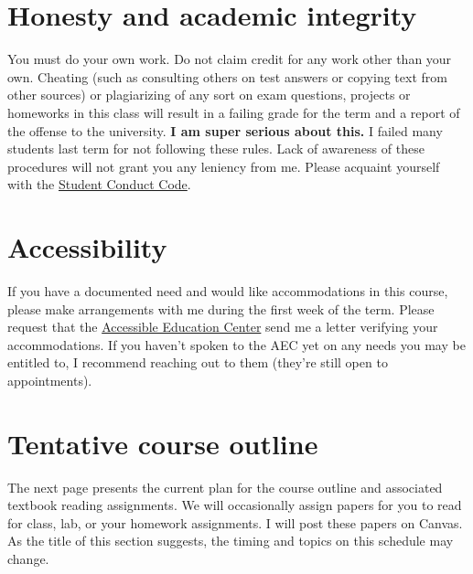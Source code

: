 \documentclass[10pt]{article}
\begin{document}
\section*{Honesty and academic integrity}

You must do your own work. Do not claim credit for any work other than your own. Cheating (such as consulting others on test answers or copying text from other sources) or plagiarizing of any sort on exam questions, projects or homeworks in this class will result in a failing grade for the term and a report of the offense to the university. \textbf{I am super serious about this.} I failed many students last term for not following these rules. Lack of awareness of these procedures will not grant you any leniency from me. Please acquaint yourself with the \href{http://studentlife.uoregon.edu}{Student Conduct Code}.

\section*{Accessibility}

If you have a documented need and would like accommodations in this course, please make arrangements with me during the first week of the term. Please request that the \href{https://aec.uoregon.edu/}{Accessible Education Center} send me a letter verifying your accommodations. If you haven't spoken to the AEC yet on any needs you may be entitled to, I recommend reaching out to them (they're still open to appointments).

\section*{Tentative course outline}

The next page presents the current plan for the course outline and associated textbook reading assignments. We will occasionally assign papers for you to read for class, lab, or your homework assignments. I will post these papers on Canvas. As the title of this section suggests, the timing and topics on this schedule may change.
\end{document}
